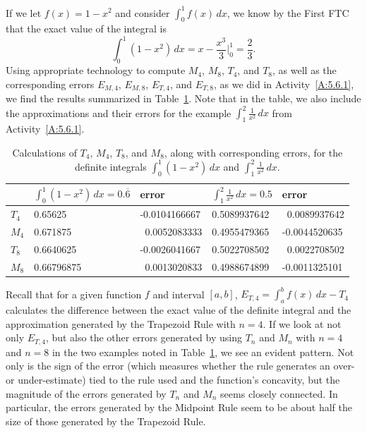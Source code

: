 If we let $f(x) = 1-x^2$ and consider $\int_0^1 f(x) \,dx$, we know by the First FTC that the exact value of the integral is
$$\int_0^1 (1-x^2) \, dx = x - \frac{x^3}{3} \bigg\vert_0^1 = \frac{2}{3}.$$
Using appropriate technology to compute $M_4$, $M_8$, $T_4$, and $T_8$, as well as the corresponding errors $E_{M,4}$, $E_{M,8}$, $E_{T,4}$, and $E_{T,8}$, as we did in Activity~\ref{A:5.6.1}, we find the results summarized in Table~\ref{T:5.6.Ex2}.  Note that in the table, we also include the approximations and their errors for the example $\int_1^2 \frac{1}{x^2} \, dx$ from Activity~\ref{A:5.6.1}.
\begingroup
\small
\begin{table}[h]
\begin{center}
\begin{tabular}{ | l | l | l || l | l | }
   \hline 
   \T \ & $\int_0^1 (1-x^2) \,dx = 0.\overline{6} $ &  error  & $\int_1^2 \frac{1}{x^2} \, dx = 0.5$ & error   \B \\
   \hline \hline
   \T $T_4$ & 0.65625 & -0.0104166667 & 0.5089937642 & \ 0.0089937642 \B \\
   \hline
   \T $M_4$ & 0.671875 & \ 0.0052083333 & 0.4955479365 & -0.0044520635 \B \\
   \hline
   \T $T_8$ & 0.6640625 & -0.0026041667 & 0.5022708502 & \ 0.0022708502 \B \\
   \hline
   \T $M_8$ & 0.66796875 & \ 0.0013020833 & 0.4988674899 & -0.0011325101 \B \\
   \hline
   \end{tabular} 
\end{center}
\caption{Calculations of $T_4$, $M_4$, $T_8$, and $M_8$, along with corresponding errors, for the definite integrals $\int_0^1 (1-x^2) \, dx$ and $\int_1^2 \frac{1}{x^2} \, dx$.} \label{T:5.6.Ex2}
\end{table}
\endgroup

Recall that for a given function $f$ and interval $[a,b]$, $E_{T,4} = \int_a^b f(x) \,dx - T_4$ calculates the difference between the exact value of the definite integral and the approximation generated by the Trapezoid Rule with $n = 4$.  If we look at not only $E_{T,4}$, but also the other errors generated by using $T_n$ and $M_n$ with $n = 4$ and $n = 8$ in the two examples noted in Table~\ref{T:5.6.Ex2}, we see an evident pattern.  Not only is the sign of the error (which measures whether the rule generates an over- or under-estimate) tied to the rule used and the function's concavity, but the magnitude of the errors generated by $T_n$ and $M_n$ seems closely connected.  In particular, the errors generated by the Midpoint Rule seem to be about half the size of those generated by the Trapezoid Rule.

